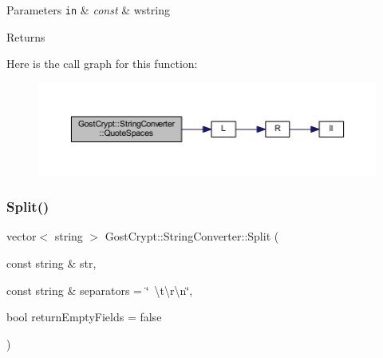 \begin{DoxyParams}[1]{Parameters}
\mbox{\tt in}  & {\em const} & wstring \\
\hline
\end{DoxyParams}
\begin{DoxyReturn}{Returns}

\end{DoxyReturn}
Here is the call graph for this function\+:
\nopagebreak
\begin{figure}[H]
\begin{center}
\leavevmode
\includegraphics[width=350pt]{class_gost_crypt_1_1_string_converter_a1dc1f215db66d2a4bb4d0b907513934f_cgraph}
\end{center}
\end{figure}
\mbox{\label{class_gost_crypt_1_1_string_converter_a4e488a929da871d20de099fcc48e90f7}} 
\subsubsection{\texorpdfstring{Split()}{Split()}}
{\footnotesize\ttfamily vector$<$ string $>$ Gost\+Crypt\+::\+String\+Converter\+::\+Split (\begin{DoxyParamCaption}\item[{const string \&}]{str,  }\item[{const string \&}]{separators = {\ttfamily \char`\"{}~\textbackslash{}t\textbackslash{}r\textbackslash{}n\char`\"{}},  }\item[{bool}]{return\+Empty\+Fields = {\ttfamily false} }\end{DoxyParamCaption})\hspace{0.3cm}{\ttfamily [static]}}


